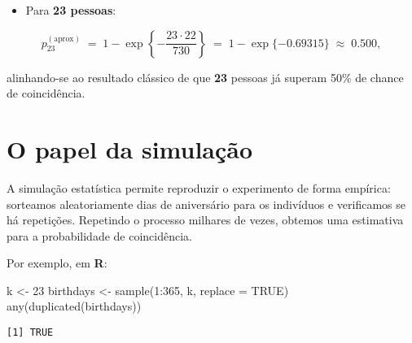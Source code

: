\documentclass[
  letterpaper,
  DIV=11,
  numbers=noendperiod]{scrreprt}
\newenvironment{Shaded}{\begin{snugshade}}{\end{snugshade}}
\newcommand{\AttributeTok}[1]{\textcolor[rgb]{0.40,0.45,0.13}{#1}}
\newcommand{\ConstantTok}[1]{\textcolor[rgb]{0.56,0.35,0.01}{#1}}
\newcommand{\DecValTok}[1]{\textcolor[rgb]{0.68,0.00,0.00}{#1}}
\newcommand{\FunctionTok}[1]{\textcolor[rgb]{0.28,0.35,0.67}{#1}}
\newcommand{\NormalTok}[1]{\textcolor[rgb]{0.00,0.23,0.31}{#1}}
\newcommand{\OtherTok}[1]{\textcolor[rgb]{0.00,0.23,0.31}{#1}}
\newcommand{\SpecialCharTok}[1]{\textcolor[rgb]{0.37,0.37,0.37}{#1}}
\providecommand{\tightlist}{%
  \setlength{\itemsep}{0pt}\setlength{\parskip}{0pt}}\usepackage{longtable,booktabs,array}
\begin{document}
\begin{tcolorbox}[enhanced jigsaw, coltitle=black, bottomtitle=1mm, toprule=.15mm, arc=.35mm, colframe=quarto-callout-warning-color-frame, breakable, opacityback=0, bottomrule=.15mm, rightrule=.15mm, titlerule=0mm, toptitle=1mm, title=\textcolor{quarto-callout-warning-color}{\faExclamationTriangle}\hspace{0.5em}{Exemplo Rápido}, leftrule=.75mm, opacitybacktitle=0.6, left=2mm, colback=white, colbacktitle=quarto-callout-warning-color!10!white]

\begin{itemize}
\tightlist
\item
  Para \textbf{23 pessoas}:
\end{itemize}

\[p_{23}^{(\text{aprox})}
  \;=\;
  1 - \exp\!\left\{-\frac{23\cdot22}{730}\right\}
  \;=\;
  1 - \exp\!\{-0.69315\}
  \;\approx\; 0.500,\]

alinhando-se ao resultado clássico de que \textbf{23} pessoas já superam
50\% de chance de coincidência.

\end{tcolorbox}

\section{O papel da simulação}\label{o-papel-da-simulauxe7uxe3o}

A simulação estatística permite reproduzir o experimento de forma
empírica: sorteamos aleatoriamente dias de aniversário para os
indivíduos e verificamos se há repetições. Repetindo o processo milhares
de vezes, obtemos uma estimativa para a probabilidade de coincidência.

Por exemplo, em \textbf{R}:

\begin{Shaded}
\begin{Highlighting}[]
\NormalTok{k }\OtherTok{\textless{}{-}} \DecValTok{23}
\NormalTok{birthdays }\OtherTok{\textless{}{-}} \FunctionTok{sample}\NormalTok{(}\DecValTok{1}\SpecialCharTok{:}\DecValTok{365}\NormalTok{, k, }\AttributeTok{replace =} \ConstantTok{TRUE}\NormalTok{)}
\FunctionTok{any}\NormalTok{(}\FunctionTok{duplicated}\NormalTok{(birthdays))}
\end{Highlighting}
\end{Shaded}

\begin{verbatim}
[1] TRUE
\end{verbatim}
\end{document}
